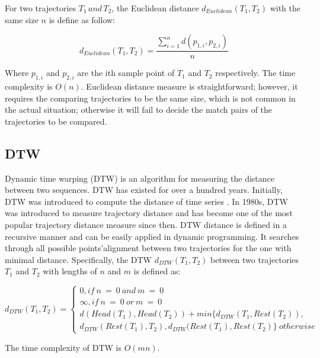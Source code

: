 \documentclass[a4paper, 12pt]{article}
\begin{document}
For two trajectories $T_{1}\,and\,T_{2}$, the Euclidean distance $d_{Euclidean}(T_{1}, T_{2})$ with the same size $n$ is define as follow:

\begin{equation} \label{eq1}
    d_{Euclidean}(T_{1}, T_{2}) = \frac{\sum_{i=1}^n d(p_{1,i}, p_{2,i})}{n}
\end{equation}

Where $p_{1,i}$ and $p_{2,i}$ are the ith sample point of $T_{1}$ and $T_{2}$ respectively. The time complexity is $O(n)$. Euclidean distance measure is straightforward; however, it requires the comparing trajectories to be the same size, which is not common in the actual situation; otherwise it will fail to decide the match pairs of the trajectories to be compared.

\subsection{DTW}
Dynamic time warping (DTW) is an algorithm for measuring the distance between two sequences. DTW has existed for over a hundred years. Initially, DTW was introduced to compute the distance of time series \citep{myers1980performance}. In 1980s, DTW was introduced to measure trajectory distance \citep{kruskal1983overview} and has become one of the most popular trajectory distance measure since then. DTW distance is defined in a recursive manner and can be easily applied in dynamic programming. It searches through all possible points’alignment between two trajectories for the one with minimal distance. Specifically, the DTW $d_{DTW} (T_{1},T_{2})$ between two trajectories $T_{1}$ and $T_{2}$ with lengths of $n$ and $m$ is defined as:

\begin{equation} \label{eq2}
    d_{DTW} (T_{1},T_{2}) = \begin{cases}
                                0, if\:n\:=\:0\:and\:m\:=\:0 \\
                                \infty, if\:n\:=\:0\:or\:m\:=\:0 \\
                                d(Head(T_{1}), Head(T_{2})) + min\{d_{DTW}(T_{1}, Rest(T_{2})), \\ d_{DTW}(Rest(T_{1}), T_{2}), d_{DTW}(Rest(T_{1}), Rest(T_{2}) \} \: otherwise
                            \end{cases}
\end{equation}

The time complexity of DTW is $O(mn)$.


\end{document}
